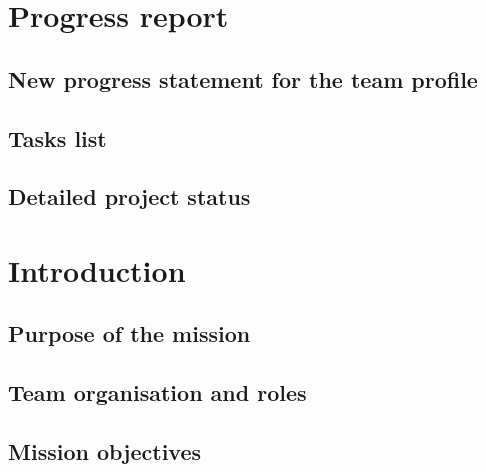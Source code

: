 \documentclass[11pt]{article}
\begin{document}
\newpage

\tableofcontents
\pagestyle{plain}

\newpage





\section{Progress report}

\subsection{New progress statement for the team profile}

\subsection{Tasks list}

\subsection{Detailed project status}




\section{Introduction}

\subsection{Purpose of the mission}

\subsection{Team organisation and roles}

\subsection{Mission objectives}
\end{document}
